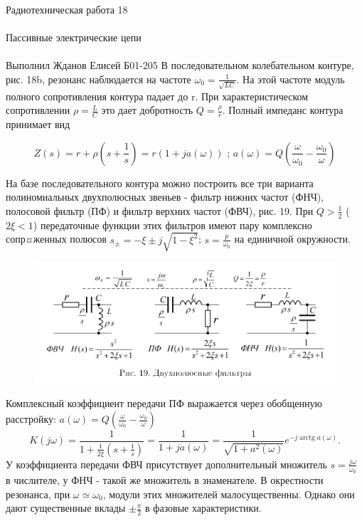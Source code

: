 \documentclass{astroedu-lab}
\begin{document}
\begin{problem}{\huge Радиотехническая работа 18\\\\Пассивные электрические цепи\\\\Выполнил Жданов Елисей Б01-205}
В последовательном колебательном контуре, рис. 18b, резонанс наблюдается на частоте $\omega_0 = \frac{1}{\sqrt{L C}}$. На этой частоте модуль полного сопротивления контура падает до r. При характеристическом сопротивлении $\rho = \frac{L}{C}$ это дает добротность $Q = \frac{\rho}{r}$. Полный импеданс контура принимает вид

\begin{equation}
	Z(s) = r + \rho \left(s + \frac{1}{s} \right) = r \left(1 + j a(\omega) \right) \text{ ; } a(\omega) = Q \left( \frac{\omega}{\omega_0} - \frac{\omega_0}{\omega} \right)
\end{equation}

На базе последовательного контура можно построить все три варианта полиномиальных двухполюсных звеньев - фильтр нижних частот (ФНЧ), полосовой фильтр (ПФ) и фильтр верхних частот (ФВЧ), рис. 19. При $Q > \frac{1}{2}$ ($2\xi < 1$) передаточные функции этих фильтров имеют пару комплексно сопр¤женных полюсов $s_{\pm} = -\xi \pm j\sqrt{1-\xi^2}$; $s = \frac{p}{\omega_0}$ на единичной окружности.

\begin{figure}[!h]
	\centering
	\includegraphics[width=1\textwidth]{4_2.png}
	\label{fig:boiler}
\end{figure}

Комплексный коэффициент передачи ПФ выражается через обобщенную расстройку: $a(\omega)=Q\left(\frac{\omega}{\omega_0}-\frac{\omega_0}{\omega}\right)$
$$
K(j \omega)=\frac{1}{1+\frac{1}{2 \xi}\left(s+\frac{1}{s}\right)}=\frac{1}{1+j a(\omega)}=\frac{1}{\sqrt{1+a^2(\omega)}} e^{-j \operatorname{arctg} a(\omega)} .
$$
У коэффициента передачи ФВЧ присутствует дополнительный множитель $s=\frac{j \omega}{\omega_0}$ в числителе, у ФНЧ - такой же множитель в знаменателе. В окрестности резонанса, при $\omega \simeq \omega_0$, модули этих множителей малосущественны. Однако они дают существенные вклады $\pm \frac{\pi}{2}$ в фазовые характеристики.


\end{problem}
\end{document}
